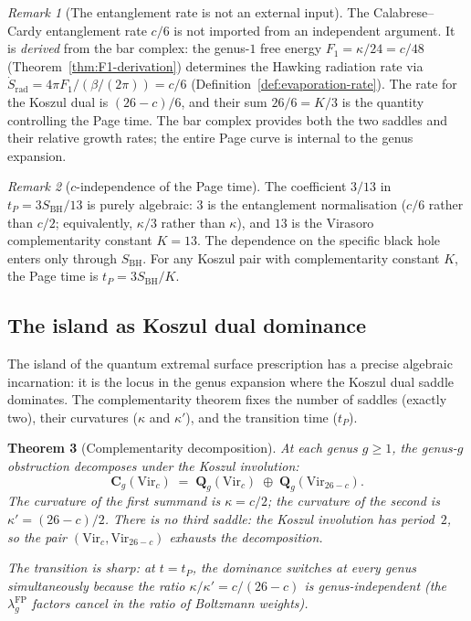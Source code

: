 \documentclass[11pt,reqno]{amsart}
\newtheorem{theorem}{Theorem}[section]
\theoremstyle{definition}
\theoremstyle{remark}
\newtheorem{remark}[theorem]{Remark}
\begin{document}
\begin{remark}[The entanglement rate is not an external input]
\label{rem:rate-from-genus}
The Calabrese--Cardy entanglement rate $c/6$ is not imported
from an independent argument. It is \emph{derived} from the
bar complex: the genus-$1$ free energy
$F_1 = \kappa/24 = c/48$
(Theorem~\ref{thm:F1-derivation})
determines the Hawking radiation rate via
$\dot{S}_{\mathrm{rad}} = 4\pi F_1/(\beta/(2\pi)) = c/6$
(Definition~\ref{def:evaporation-rate}).
The rate for the Koszul dual is $(26-c)/6$, and their sum
$26/6 = K/3$ is the quantity controlling the Page time.
The bar complex provides both the two saddles and their
relative growth rates; the entire Page curve is internal
to the genus expansion.
\end{remark}

\begin{remark}[$c$-independence of the Page time]
\label{rem:c-independence}
The coefficient $3/13$ in
$t_P = 3S_{\mathrm{BH}}/13$ is purely algebraic:
$3$ is the entanglement normalisation ($c/6$ rather than
$c/2$; equivalently, $\kappa/3$ rather than $\kappa$), and $13$
is the Virasoro complementarity constant $K = 13$.
The dependence on the specific black hole enters only through
$S_{\mathrm{BH}}$.
For any Koszul pair with complementarity constant $K$, the
Page time is $t_P = 3S_{\mathrm{BH}}/K$.
\end{remark}

\subsection{The island as Koszul dual dominance}

The island of the quantum extremal surface prescription has a
precise algebraic incarnation: it is the locus in the genus
expansion where the Koszul dual saddle dominates. The
complementarity theorem fixes the number of saddles (exactly two),
their curvatures ($\kappa$ and $\kappa'$), and the transition
time ($t_P$).

\begin{theorem}[Complementarity decomposition]
\label{thm:complementarity-decomposition}
At each genus $g \ge 1$, the genus-$g$ obstruction decomposes
under the Koszul involution:
\begin{equation}\label{eq:complementarity-decomposition}
\mathbf{C}_g(\mathrm{Vir}_c)
\;=\;
\mathbf{Q}_g(\mathrm{Vir}_c)
\;\oplus\;
\mathbf{Q}_g(\mathrm{Vir}_{26-c}).
\end{equation}
The curvature of the first summand is $\kappa = c/2$; the
curvature of the second is $\kappa' = (26-c)/2$.
There is no third saddle: the Koszul involution has period~$2$,
so the pair $(\mathrm{Vir}_c, \mathrm{Vir}_{26-c})$ exhausts
the decomposition.

The transition is sharp: at $t = t_P$, the dominance switches
at every genus simultaneously because the ratio
$\kappa/\kappa' = c/(26-c)$ is genus-independent (the
$\lambda_g^{\mathrm{FP}}$ factors cancel in the ratio of
Boltzmann weights).
\end{theorem}
\end{document}

